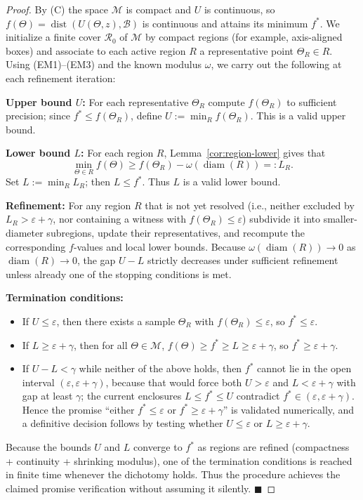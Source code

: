 \documentclass[12pt]{article}
\theoremstyle{definition}
\theoremstyle{plain}
\begin{document}
\begin{proof}
By (C) the space \(\mathcal M\) is compact and \(U\) is continuous, so \(f(\Theta)=\operatorname{dist}(U(\Theta,z),\mathcal B)\) is continuous and attains its minimum \(f^*\). We initialize a finite cover \(\mathcal R_0\) of \(\mathcal M\) by compact regions (for example, axis-aligned boxes) and associate to each active region \(R\) a representative point \(\Theta_R\in R\). Using (EM1)--(EM3) and the known modulus \(\omega\), we carry out the following at each refinement iteration:

\textbf{Upper bound \(U\):} For each representative \(\Theta_R\) compute \(f(\Theta_R)\) to sufficient precision; since \(f^*\le f(\Theta_R)\), define \(U := \min_{R} f(\Theta_R)\). This is a valid upper bound.

\textbf{Lower bound \(L\):} For each region \(R\), Lemma~\ref{cor:region-lower} gives that
\[
\min_{\Theta\in R} f(\Theta) \ge f(\Theta_R) - \omega(\operatorname{diam}(R)) =: L_R.
\]
Set \(L := \min_R L_R\); then \(L\le f^*\). Thus \(L\) is a valid lower bound.

\textbf{Refinement:} For any region \(R\) that is not yet resolved (i.e., neither excluded by \(L_R>\varepsilon+\gamma\), nor containing a witness with \(f(\Theta_R)\le \varepsilon\)) subdivide it into smaller-diameter subregions, update their representatives, and recompute the corresponding \(f\)-values and local lower bounds. Because \(\omega(\operatorname{diam}(R))\to 0\) as \(\operatorname{diam}(R)\to 0\), the gap \(U-L\) strictly decreases under sufficient refinement unless already one of the stopping conditions is met.

\textbf{Termination conditions:}
\begin{itemize}
  \item If \(U\le \varepsilon\), then there exists a sample \(\Theta_R\) with \(f(\Theta_R)\le\varepsilon\), so \(f^*\le\varepsilon\).
  \item If \(L\ge \varepsilon+\gamma\), then for all \(\Theta\in\mathcal M\), \(f(\Theta)\ge f^*\ge L\ge \varepsilon+\gamma\), so \(f^*\ge \varepsilon+\gamma\).
  \item If \(U-L<\gamma\) while neither of the above holds, then \(f^*\) cannot lie in the open interval \((\varepsilon,\varepsilon+\gamma)\), because that would force both \(U>\varepsilon\) and \(L<\varepsilon+\gamma\) with gap at least \(\gamma\); the current enclosures \(L\le f^*\le U\) contradict \(f^*\in(\varepsilon,\varepsilon+\gamma)\). Hence the promise ``either \(f^*\le\varepsilon\) or \(f^*\ge\varepsilon+\gamma\)'' is validated numerically, and a definitive decision follows by testing whether \(U\le\varepsilon\) or \(L\ge\varepsilon+\gamma\).
\end{itemize}

Because the bounds \(U\) and \(L\) converge to \(f^*\) as regions are refined (compactness + continuity + shrinking modulus), one of the termination conditions is reached in finite time whenever the dichotomy holds. Thus the procedure achieves the claimed promise verification without assuming it silently. \(\blacksquare\)
\end{proof}
\end{document}
